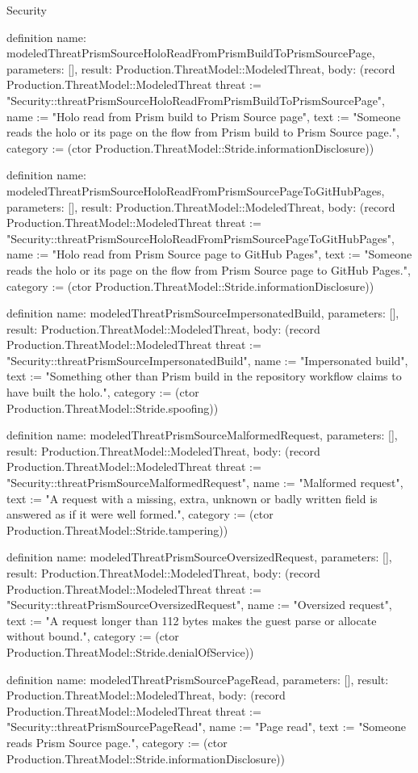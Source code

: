 \begin{lexlean}{Security}
\begin{semanticmodule}
definition{
  name: modeledThreatPrismSourceHoloReadFromPrismBuildToPrismSourcePage,
  parameters: [],
  result: Production.ThreatModel::ModeledThreat,
  body: (record Production.ThreatModel::ModeledThreat {threat := "Security::threatPrismSourceHoloReadFromPrismBuildToPrismSourcePage", name := "Holo read from Prism build to Prism Source page", text := "Someone reads the holo or its page on the flow from Prism build to Prism Source page.", category := (ctor Production.ThreatModel::Stride.informationDisclosure)})
}

definition{
  name: modeledThreatPrismSourceHoloReadFromPrismSourcePageToGitHubPages,
  parameters: [],
  result: Production.ThreatModel::ModeledThreat,
  body: (record Production.ThreatModel::ModeledThreat {threat := "Security::threatPrismSourceHoloReadFromPrismSourcePageToGitHubPages", name := "Holo read from Prism Source page to GitHub Pages", text := "Someone reads the holo or its page on the flow from Prism Source page to GitHub Pages.", category := (ctor Production.ThreatModel::Stride.informationDisclosure)})
}

definition{
  name: modeledThreatPrismSourceImpersonatedBuild,
  parameters: [],
  result: Production.ThreatModel::ModeledThreat,
  body: (record Production.ThreatModel::ModeledThreat {threat := "Security::threatPrismSourceImpersonatedBuild", name := "Impersonated build", text := "Something other than Prism build in the repository workflow claims to have built the holo.", category := (ctor Production.ThreatModel::Stride.spoofing)})
}

definition{
  name: modeledThreatPrismSourceMalformedRequest,
  parameters: [],
  result: Production.ThreatModel::ModeledThreat,
  body: (record Production.ThreatModel::ModeledThreat {threat := "Security::threatPrismSourceMalformedRequest", name := "Malformed request", text := "A request with a missing, extra, unknown or badly written field is answered as if it were well formed.", category := (ctor Production.ThreatModel::Stride.tampering)})
}

definition{
  name: modeledThreatPrismSourceOversizedRequest,
  parameters: [],
  result: Production.ThreatModel::ModeledThreat,
  body: (record Production.ThreatModel::ModeledThreat {threat := "Security::threatPrismSourceOversizedRequest", name := "Oversized request", text := "A request longer than 112 bytes makes the guest parse or allocate without bound.", category := (ctor Production.ThreatModel::Stride.denialOfService)})
}

definition{
  name: modeledThreatPrismSourcePageRead,
  parameters: [],
  result: Production.ThreatModel::ModeledThreat,
  body: (record Production.ThreatModel::ModeledThreat {threat := "Security::threatPrismSourcePageRead", name := "Page read", text := "Someone reads Prism Source page.", category := (ctor Production.ThreatModel::Stride.informationDisclosure)})
}


\end{semanticmodule}
\end{lexlean}
